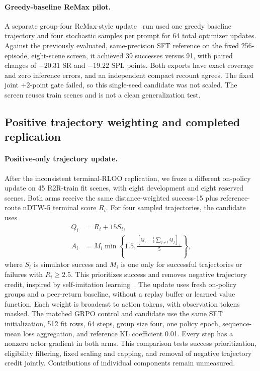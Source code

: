 \documentclass[10pt,twocolumn,letterpaper]{article}
\begin{document}
\paragraph{Greedy-baseline ReMax pilot.} A separate group-four ReMax-style
update~\cite{pmlr-v235-li24cd}
run used one greedy baseline trajectory and four stochastic samples per
prompt for 64 total optimizer updates. Against the previously evaluated,
same-precision SFT reference on the fixed 256-episode, eight-scene screen,
it achieved 39 successes versus 91, with paired changes of $-20.31$ SR and
$-19.22$ SPL points. Both exports have exact coverage and zero inference
errors, and an independent compact recount agrees. The fixed joint
$+2$-point gate failed, so this single-seed candidate was not scaled. The
screen reuses train scenes and is not a clean generalization test.

\subsection{Positive trajectory weighting and completed replication}
\paragraph{Positive-only trajectory update.} After the inconsistent
terminal-RLOO replication, we froze a different on-policy update on
45 R2R-train fit scenes, with eight development and eight reserved scenes.
Both arms receive the same distance-weighted success-15 plus reference-route
nDTW-5 terminal score $R_i$. For four sampled trajectories, the candidate uses
\begin{equation}
\begin{aligned}
Q_i &= R_i + 15S_i, \\
A_i &= M_i\min\!\left\{1.5,\frac{[Q_i-\frac{1}{3}\sum_{j\ne i}Q_j]_+}{5}\right\},
\end{aligned}
\end{equation}
where $S_i$ is simulator success and $M_i$ is one only for successful
trajectories or failures with $R_i\ge2.5$. This prioritizes success and
removes negative trajectory credit, inspired by self-imitation
learning~\cite{oh2018sil}. The update uses fresh on-policy groups and a
peer-return baseline, without a replay buffer or learned value function.
Each weight is broadcast to action tokens, with observation tokens masked.
The matched GRPO control and candidate use the same SFT initialization,
512 fit rows, 64 steps, group size four, one policy epoch, sequence-mean
loss aggregation, and reference KL coefficient 0.01. Every step has a
nonzero actor gradient in both arms.
This comparison tests success prioritization, eligibility filtering,
fixed scaling and capping, and removal of negative trajectory credit
jointly. Contributions of individual components remain unmeasured.
\end{document}
